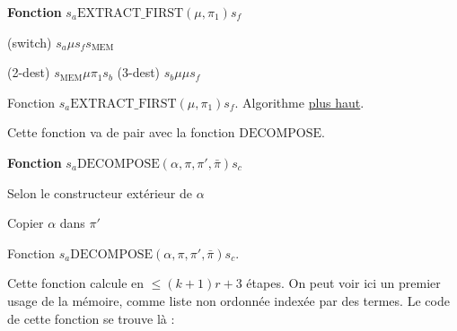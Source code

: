 \begin{appendices}
		\espace
		
		\begin{algorithm}[H]
			\label{prog:A_RAM_fn_extract_first}
			
			\textbf{Fonction} $s_a \text{EXTRACT\_FIRST}(\mu, \pi_1) s_f$
			
			\espace
			
			
			(switch)	$s_a \mu s_f s_{\text{MEM}}$\;
			
			(2-dest) 	$s_{\text{MEM}} \mu \pi_1 s_b$\;
			(3-dest) 	$s_b \mu \mu s_f$\;
			
			
			\caption{Fonction $s_a \text{EXTRACT\_FIRST}(\mu, \pi_1) s_f$. Algorithme \hyperref[algo:A_RAM_fn_extract_first]{plus haut}. }
		\end{algorithm}
		
		\espace 
		
		Cette fonction va de pair avec la fonction $\text{DECOMPOSE}$.

		\espace 
		
		\begin{algorithm}[H]
			\label{algo:A_RAM_fn_DECOMPOSE}
			
			\textbf{Fonction} $s_a \text{DECOMPOSE}(\alpha, \pi, \pi', \bar{\pi}) s_c$
			
			\espace 
			
			
			
			Selon le constructeur extérieur de $\alpha$ \;
			
			
			Copier $\alpha$ dans $\pi'$ \;
			
			\caption{Fonction $s_a \text{DECOMPOSE}(\alpha, \pi, \pi', \bar{\pi}) s_c$.}
		\end{algorithm}
		
		\espace
		
		Cette fonction calcule en $\leq (k+1)r+3$ étapes. On peut voir ici un premier usage de la mémoire, comme liste non ordonnée indexée par des termes. Le code de cette fonction se trouve là :
		

\end{appendices}
